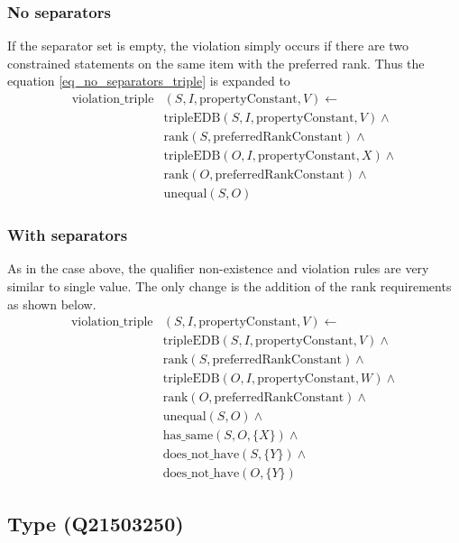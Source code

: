 \documentclass[hyperref,bachelorofscience,fleqn]{cgvpub}
\begin{document}
\subsubsection{No separators}
If the separator set is empty, the violation simply occurs if there are two constrained statements on the same item with the preferred rank. Thus the equation \ref{eq_no_separators_triple} is expanded to
\begin{equation*}
\begin{split}
\text{violation\_triple}&(S, I, \text{propertyConstant}, V) \leftarrow \\
&\text{tripleEDB}(S, I, \text{propertyConstant}, V) \wedge \\
&\text{rank}(S, \text{preferredRankConstant}) \wedge \\
&\text{tripleEDB}(O, I, \text{propertyConstant}, X) \wedge \\
&\text{rank}(O, \text{preferredRankConstant}) \wedge \\
&\text{unequal}(S, O)
\end{split}
\end{equation*}

\subsubsection{With separators}
As in the case above, the qualifier non-existence and violation rules are very similar to single value. The only change is the addition of the rank requirements as shown below.
\begin{equation*}
\begin{split}
\text{violation\_triple}&(S, I, \text{propertyConstant}, V) \leftarrow \\
&\text{tripleEDB}(S, I, \text{propertyConstant}, V) \wedge \\
&\text{rank}(S, \text{preferredRankConstant}) \wedge \\
&\text{tripleEDB}(O, I, \text{propertyConstant}, W) \wedge \\
&\text{rank}(O, \text{preferredRankConstant}) \wedge \\
&\text{unequal}(S, O) \wedge \\
&\text{has\_same}(S, O, \{X\}) \wedge \\
&\text{does\_not\_have}(S, \{Y\}) \wedge \\
&\text{does\_not\_have}(O, \{Y\})
\end{split}
\end{equation*}

\subsection{Type (Q21503250)}
\end{document}

